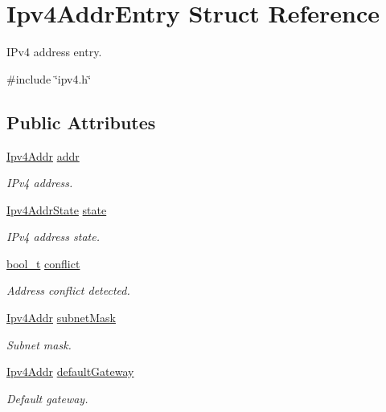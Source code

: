 \hypertarget{structIpv4AddrEntry}{}\section{Ipv4\+Addr\+Entry Struct Reference}
\label{structIpv4AddrEntry}


I\+Pv4 address entry.  




{\ttfamily \#include \char`\"{}ipv4.\+h\char`\"{}}

\subsection*{Public Attributes}
\begin{DoxyCompactItemize}
\item 
\hyperlink{ipv4_8h_a411debb3d770caa0c06d3f73367da37f}{Ipv4\+Addr} \hyperlink{structIpv4AddrEntry_a63f7b289c827b77a86f2824468b74fbf}{addr}
\begin{DoxyCompactList}\small\item\em I\+Pv4 address. \end{DoxyCompactList}\item 
\hyperlink{ipv4_8h_a7bc59b5d625b1217a91f1db3917e8358}{Ipv4\+Addr\+State} \hyperlink{structIpv4AddrEntry_a36c6c6703cbac5cd8fd16ffd1abd7622}{state}
\begin{DoxyCompactList}\small\item\em I\+Pv4 address state. \end{DoxyCompactList}\item 
\hyperlink{compiler__port_8h_a812d16e5494522586b3784e55d479912}{bool\+\_\+t} \hyperlink{structIpv4AddrEntry_a99a82bf5609db4f21877d2e62a69972a}{conflict}
\begin{DoxyCompactList}\small\item\em Address conflict detected. \end{DoxyCompactList}\item 
\hyperlink{ipv4_8h_a411debb3d770caa0c06d3f73367da37f}{Ipv4\+Addr} \hyperlink{structIpv4AddrEntry_abf3ce17e6967f88d615be5ace1b12da7}{subnet\+Mask}
\begin{DoxyCompactList}\small\item\em Subnet mask. \end{DoxyCompactList}\item 
\hyperlink{ipv4_8h_a411debb3d770caa0c06d3f73367da37f}{Ipv4\+Addr} \hyperlink{structIpv4AddrEntry_a6412d2664b448d636ce53d4edc71366c}{default\+Gateway}
\begin{DoxyCompactList}\small\item\em Default gateway. \end{DoxyCompactList}\end{DoxyCompactItemize}


